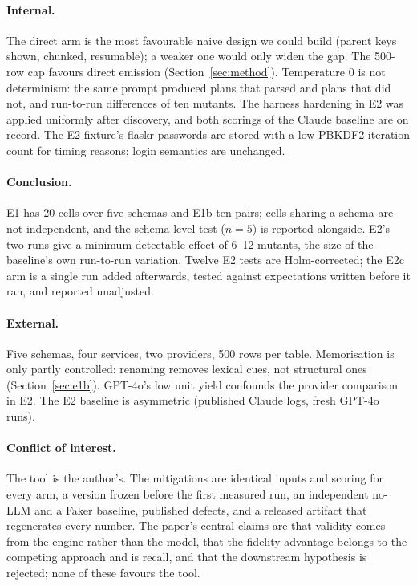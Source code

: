 \documentclass[preprint,12pt]{elsarticle}
\begin{document}
\paragraph{Internal.} The direct arm is the most favourable naive design we could build (parent keys shown, chunked, resumable); a weaker one would only widen the gap. The 500-row cap favours direct emission (Section~\ref{sec:method}). Temperature 0 is not determinism: the same prompt produced plans that parsed and plans that did not, and run-to-run differences of ten mutants. The harness hardening in E2 was applied uniformly after discovery, and both scorings of the Claude baseline are on record. The E2 fixture's flaskr passwords are stored with a low PBKDF2 iteration count for timing reasons; login semantics are unchanged.
\paragraph{Conclusion.} E1 has 20 cells over five schemas and E1b ten pairs; cells sharing a schema are not independent, and the schema-level test ($n=5$) is reported alongside. E2's two runs give a minimum detectable effect of 6--12 mutants, the size of the baseline's own run-to-run variation. Twelve E2 tests are Holm-corrected; the E2c arm is a single run added afterwards, tested against expectations written before it ran, and reported unadjusted.
\paragraph{External.} Five schemas, four services, two providers, 500 rows per table. Memorisation is only partly controlled: renaming removes lexical cues, not structural ones (Section~\ref{sec:e1b}). GPT-4o's low unit yield confounds the provider comparison in E2. The E2 baseline is asymmetric (published Claude logs, fresh GPT-4o runs).
\paragraph{Conflict of interest.} The tool is the author's. The mitigations are identical inputs and scoring for every arm, a version frozen before the first measured run, an independent no-LLM and a Faker baseline, published defects, and a released artifact that regenerates every number. The paper's central claims are that validity comes from the engine rather than the model, that the fidelity advantage belongs to the competing approach and is recall, and that the downstream hypothesis is rejected; none of these favours the tool.
\end{document}
